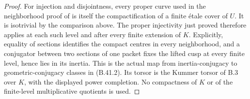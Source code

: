 \documentclass[11pt,oneside]{article}
\begin{document}
\begin{proof}
For injection and disjointness, every proper
curve used in the neighborhood proof of
\cite[Theorem 14]{B_StixCuspidal} is itself the
compactification of a finite \'etale cover of
$U$. It is isotrivial by the comparison above.
The proper injectivity just proved therefore
applies at each such level and after every
finite extension of $K$. Explicitly,
equality of sections identifies the compact
centres in every neighborhood, and a conjugator
between two sections of one packet fixes the
lifted cusp at every finite level, hence lies
in its inertia. This is the actual map from
inertia-conjugacy to geometric-conjugacy classes
in (B.41.2). Its torsor is the Kummer torsor
of B.3 over $K$, with the displayed power
completion. No compactness of $K$ or of the
finite-level multiplicative quotients is used.
\end{proof}
\end{document}
